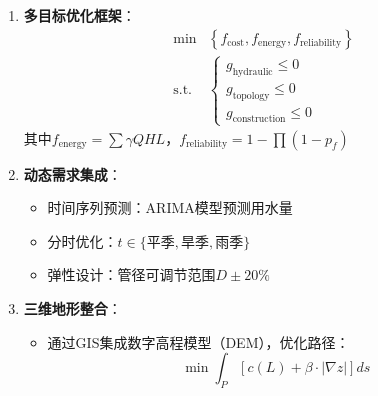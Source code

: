 \documentclass[12pt,a4paper]{article}
\begin{document}
\begin{enumerate}
  \item \textbf{多目标优化框架}：
  \begin{align*}
    \min & \left\{ f_{\text{cost}}, f_{\text{energy}}, f_{\text{reliability}} \right\} \\
    \text{s.t.} & \begin{cases} 
      g_{\text{hydraulic}} \leq 0 \\
      g_{\text{topology}} \leq 0 \\
      g_{\text{construction}} \leq 0 
    \end{cases}
  \end{align*}
  其中$f_{\text{energy}} = \sum \gamma Q H L$，$f_{\text{reliability}} = 1 - \prod (1 - p_f)$
  
  \item \textbf{动态需求集成}：
  \begin{itemize}
    \item 时间序列预测：ARIMA模型预测用水量
    \item 分时优化：$t \in \{ \text{平季}, \text{旱季}, \text{雨季} \}$
    \item 弹性设计：管径可调节范围$D \pm 20\%$
  \end{itemize}
  
  \item \textbf{三维地形整合}：
  \begin{itemize}
    \begin{figure}[H]
      \centering
      \caption{地形高程整合示意图}
      \label{fig:terrain}
    \end{figure}
    \item 通过GIS集成数字高程模型（DEM），优化路径：
    \[
    \min \int_{P} \left[ c(L) + \beta \cdot |\nabla z| \right] ds
    \]
  \end{itemize}
\end{enumerate}
\end{document}
